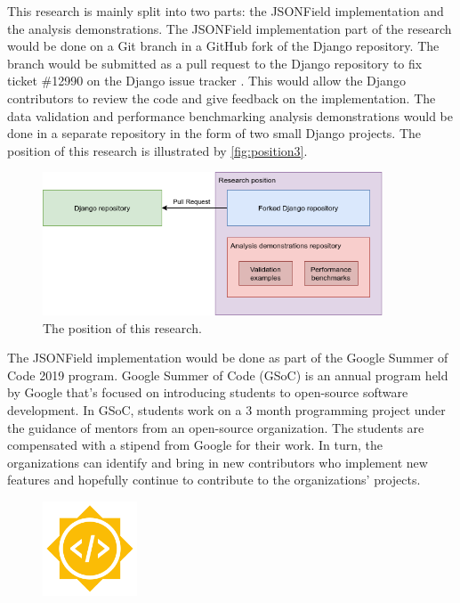 This research is mainly split into two parts: the JSONField implementation and
the analysis demonstrations. The JSONField implementation part of the research
would be done on a Git branch in a GitHub fork of the Django repository. The
branch would be submitted as a pull request to the Django repository to fix
ticket \#12990 on the Django issue tracker \cite{ticket_12990}. This would
allow the Django contributors to review the code and give feedback on the
implementation. The data validation and performance benchmarking analysis
demonstrations would be done in a separate repository in the form of two small
Django projects. The position of this research is illustrated by
\autoref{fig:position3}.

\begin{figure}
	\centering
    \includegraphics[width=0.90\textwidth]{pics/position3.png}
	\caption{The position of this research.}
	\label{fig:position3}
\end{figure}

The JSONField implementation would be done as part of the Google Summer of Code
2019 program. Google Summer of Code (GSoC) is an annual program held by Google
that's focused on introducing students to open-source software development. In
GSoC, students work on a 3 month programming project under the guidance of
mentors from an open-source organization. The students are compensated with a
stipend from Google for their work. In turn, the organizations can identify and
bring in new contributors who implement new features and hopefully continue to
contribute to the organizations' projects.

\begin{figure}
	\centering
    \includegraphics[width=0.25\textwidth]{pics/GSoC.png}
	\label{fig:gsoc}
\end{figure}

